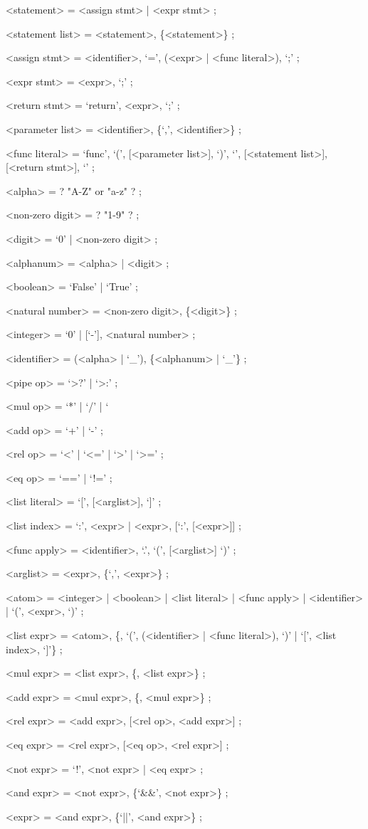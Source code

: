 \documentclass{article}
\begin{document}
	\begin{grammar}
		<statement> = <assign stmt> | <expr stmt> ;

		<statement list> = <statement>, \{<statement>\} ;

		<assign stmt> = <identifier>, `=', (<expr> | <func literal>), `;' ;

		<expr stmt> = <expr>, `;' ;

		<return stmt> = `return', <expr>, `;' ;

		<parameter list> = <identifier>, \{`,', <identifier>\} ;

		<func literal> = `func', `(', [<parameter list>], `)',
						`{', [<statement list>], [<return stmt>], `}' ;
	\end{grammar}
	\begin{grammar}
		<alpha> = ? "A-Z" or "a-z" ? ;

		<non-zero digit> = ? "1-9" ? ;

		<digit> = `0' | <non-zero digit> ;

		<alphanum> = <alpha> | <digit> ;

		<boolean> = `False' | `True' ;

		<natural number> = <non-zero digit>, \{<digit>\} ;

		<integer> = `0' | [`-'], <natural number> ;

		<identifier> = (<alpha> | `_'), \{<alphanum> | `_'\} ;

		<pipe op> = `>?' | `>:' ;

		<mul op> = `*' | `/' | `%

		<add op> = `+' | `-' ;

		<rel op> = `<' | `<=' | `>' | `>=' ;

		<eq op> = `==' | `!=' ;
	\end{grammar}
	\begin{grammar}
		<list literal> = `[', [<arglist>], `]' ;

		<list index> = `:', <expr> | <expr>, [`:', [<expr>]] ;

		<func apply> = <identifier>, `.', `(', [<arglist>] `)' ;

		<arglist> = <expr>, \{`,', <expr>\} ;

		<atom> = <integer> | <boolean> | <list literal>
				 | <func apply> | <identifier> | `(', <expr>, `)' ;
	\end{grammar}
	\begin{grammar}
		<list expr> = <atom>, \{<pipe op>,
					  `(', (<identifier> | <func literal>), `)'
					  | `[', <list index>, `]'\} ;

		<mul expr> = <list expr>, \{<mul op>, <list expr>\} ;

		<add expr> = <mul expr>, \{<add op>, <mul expr>\} ;

		<rel expr> = <add expr>, [<rel op>, <add expr>] ;

		<eq expr> = <rel expr>, [<eq op>, <rel expr>] ;

		<not expr> = `!', <not expr> | <eq expr> ;

		<and expr> = <not expr>, \{`&&', <not expr>\} ;

		<expr> = <and expr>, \{`||', <and expr>\} ;
	\end{grammar}
\end{document}
